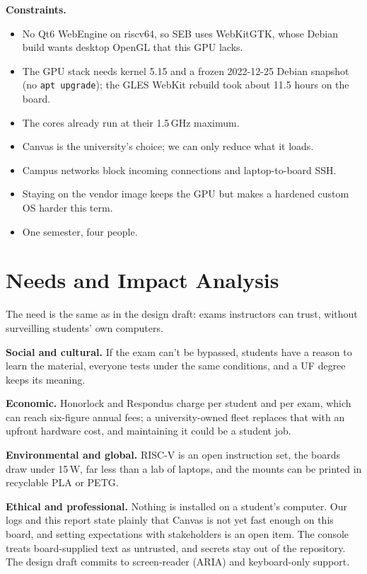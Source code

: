 \documentclass[11pt]{article}
\begin{document}
\textbf{Constraints.}
\begin{itemize}
  \item No Qt6 WebEngine on riscv64, so SEB uses WebKitGTK, whose Debian build wants desktop OpenGL that this GPU lacks.
  \item The GPU stack needs kernel 5.15 and a frozen 2022-12-25 Debian snapshot (no \texttt{apt upgrade}); the GLES WebKit rebuild took about 11.5 hours on the board.
  \item The cores already run at their 1.5\,GHz maximum.
  \item Canvas is the university's choice; we can only reduce what it loads.
  \item Campus networks block incoming connections and laptop-to-board SSH.
  \item Staying on the vendor image keeps the GPU but makes a hardened custom OS harder this term.
  \item One semester, four people.
\end{itemize}

\section{Needs and Impact Analysis}

The need is the same as in the design draft: exams instructors can trust, without surveilling students' own computers.

\textbf{Social and cultural.} If the exam can't be bypassed, students have a reason to learn the material, everyone tests under the same conditions, and a UF degree keeps its meaning.

\textbf{Economic.} Honorlock and Respondus charge per student and per exam, which can reach six-figure annual fees; a university-owned fleet replaces that with an upfront hardware cost, and maintaining it could be a student job.

\textbf{Environmental and global.} RISC-V is an open instruction set, the boards draw under 15\,W, far less than a lab of laptops, and the mounts can be printed in recyclable PLA or PETG.

\textbf{Ethical and professional.} Nothing is installed on a student's computer. Our logs and this report state plainly that Canvas is not yet fast enough on this board, and setting expectations with stakeholders is an open item. The console treats board-supplied text as untrusted, and secrets stay out of the repository. The design draft commits to screen-reader (ARIA) and keyboard-only support.
\end{document}
